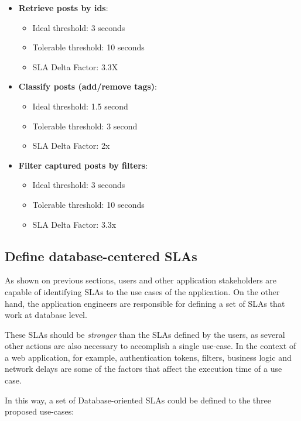 \begin{itemize}
	\item{\textbf{Retrieve posts by ids}:
		\begin{itemize}
		\item{Ideal threshold: 3 seconds}
		\item{Tolerable threshold: 10 seconds}
		\item{SLA Delta Factor: 3.3X}
		\end{itemize}
	}

	\item{\textbf{Classify posts (add/remove tags)}:
		\begin{itemize}
		\item{Ideal threshold: 1.5 second}
		\item{Tolerable threshold: 3 second}
		\item{SLA Delta Factor: 2x}
		\end{itemize}
	}

	\item{\textbf{Filter captured posts by filters}:
		\begin{itemize}
		\item{Ideal threshold: 3 seconds}
		\item{Tolerable threshold: 10 seconds}
		\item{SLA Delta Factor: 3.3x}
		\end{itemize}
	}

	\end{itemize}

\subsection{Define database-centered SLAs}
As shown on previous sections, users and other application stakeholders are capable of identifying SLAs to the use cases of the application. On the other hand, the application engineers are responsible for defining a set of SLAs that work at database level. 

These SLAs should be \textit{stronger} than the SLAs defined by the users, as several other actions are also necessary to accomplish a single use-case. In the context of a web application, for example, authentication tokens, filters, business logic and network delays are some of the factors that affect the execution time of a use case. 

In this way, a set of Database-oriented SLAs could be defined to the three proposed use-cases: 

